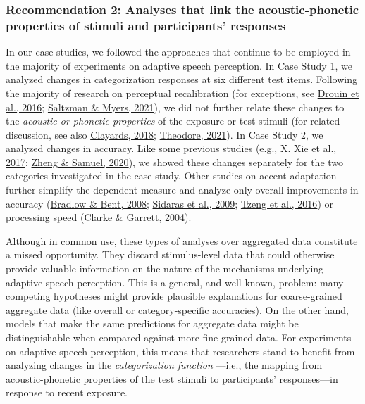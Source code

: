 \documentclass[
  11pt,
  english,
  man,floatsintext]{apa6}
\begin{document}
\hypertarget{recommendation-2-analyses-that-link-the-acoustic-phonetic-properties-of-stimuli-and-participants-responses}{%
\subsubsection{Recommendation 2: Analyses that link the acoustic-phonetic properties of stimuli and participants' responses}\label{recommendation-2-analyses-that-link-the-acoustic-phonetic-properties-of-stimuli-and-participants-responses}}

In our case studies, we followed the approaches that continue to be employed in the majority of experiments on adaptive speech perception. In Case Study 1, we analyzed changes in categorization responses at six different test items. Following the majority of research on perceptual recalibration (for exceptions, see \protect\hyperlink{ref-drouin2016}{Drouin et al., 2016}; \protect\hyperlink{ref-saltzman-myers2021}{Saltzman \& Myers, 2021}), we did not further relate these changes to the \emph{acoustic or phonetic properties} of the exposure or test stimuli (for related discussion, see also \protect\hyperlink{ref-clayards2018}{Clayards, 2018}; \protect\hyperlink{ref-theodore2021}{Theodore, 2021}). In Case Study 2, we analyzed changes in accuracy. Like some previous studies (e.g., \protect\hyperlink{ref-xie2016jep}{X. Xie et al., 2017}; \protect\hyperlink{ref-zheng-samuel2020}{Zheng \& Samuel, 2020}), we showed these changes separately for the two categories investigated in the case study. Other studies on accent adaptation further simplify the dependent measure and analyze only overall improvements in accuracy (\protect\hyperlink{ref-bradlow-bent2008}{Bradlow \& Bent, 2008}; \protect\hyperlink{ref-sidaras2009}{Sidaras et al., 2009}; \protect\hyperlink{ref-tzeng2016}{Tzeng et al., 2016}) or processing speed (\protect\hyperlink{ref-clarke-garrett2004}{Clarke \& Garrett, 2004}).

Although in common use, these types of analyses over aggregated data constitute a missed opportunity. They discard stimulus-level data that could otherwise provide valuable information on the nature of the mechanisms underlying adaptive speech perception. This is a general, and well-known, problem: many competing hypotheses might provide plausible explanations for coarse-grained aggregate data (like overall or category-specific accuracies). On the other hand, models that make the same predictions for aggregate data might be distinguishable when compared against more fine-grained data. For experiments on adaptive speech perception, this means that researchers stand to benefit from analyzing changes in the \emph{categorization function} ---i.e., the mapping from acoustic-phonetic properties of the test stimuli to participants' responses---in response to recent exposure.
\end{document}
